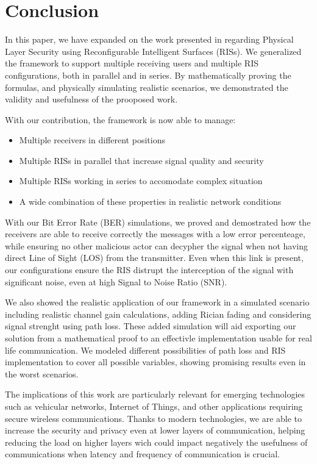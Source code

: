 \section{Conclusion}

In this paper, we have expanded on the work presented in \cite{9328149} regarding Physical Layer Security using Reconfigurable Intelligent Surfaces (RISs). We generalized the framework to support multiple receiving users and multiple RIS configurations, both in parallel and in series. By mathematically proving the formulas, and physically simulating realistic scenarios, we demonstrated the validity and usefulness of the prooposed work.

With our contribution, the framework is now able to manage:
\begin{itemize}
  \item Multiple receivers in different positions
  \item Multiple RISs in parallel that increase signal quality and security
  \item Multiple RISs working in series to accomodate complex situation
  \item A wide combination of these properties in realistic network conditions
\end{itemize}

With our Bit Error Rate (BER) simulations, we proved and demostrated how the receivers are able to receive correctly the messages with a low error percenteage, while ensuring no other malicious actor can decypher the signal when not having direct Line of Sight (LOS) from the transmitter. Even when this link is present, our configurations ensure the RIS distrupt the interception of the signal with significant noise, even at high Signal to Noise Ratio (SNR).

We also showed the realistic application of our framework in a simulated scenario including realistic channel gain calculations, adding Rician fading and considering signal strenght using path loss. These added simulation will aid exporting our solution from a mathematical proof to an effectivle implementation usable for real life communication. We modeled different possibilities of path loss and RIS implementation to cover all possible variables, showing promising results even in the worst scenarios.

The implications of this work are particularly relevant for emerging technologies such as vehicular networks, Internet of Things, and other applications requiring secure wireless communications. Thanks to modern technologies, we are able to increase the security and privacy even at lower layers of communication, helping reducing the load on higher layers wich could impact negatively the usefulness of communications when latency and frequency of communication is crucial.

